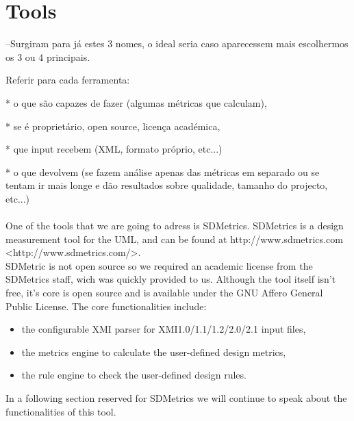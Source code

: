 \section{Tools}

--Surgiram para já estes 3 nomes, o ideal seria caso aparecessem mais escolhermos os 3 ou 4 principais.

Referir para cada ferramenta:

* o que são capazes de fazer (algumas métricas que calculam),

* se é proprietário, open source, licença académica,

* que input recebem (XML, formato próprio, etc...)

* o que devolvem (se fazem análise apenas das métricas em separado ou se tentam ir mais longe e dão resultados sobre qualidade, tamanho do projecto, etc...)\\
\\

One of the tools that we are going to adress is SDMetrics. SDMetrics is a design measurement tool for the UML, and can be found at http://www.sdmetrics.com <http://www.sdmetrics.com/>.\\
SDMetric is not open source so we required an academic license from the SDMetrics staff, wich was quickly provided to us. Although the tool itself isn't free, it's core is open source and is available under the GNU Affero General Public License. The core functionalities include:
\begin{itemize}
\item the configurable XMI parser for XMI1.0/1.1/1.2/2.0/2.1 input files,
\item the metrics engine to calculate the user-defined design metrics,
\item the rule engine to check the user-defined design rules.
\end{itemize}
In a following section reserved for SDMetrics we will continue to speak about the functionalities of this tool.
